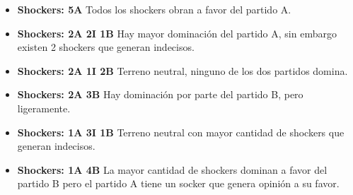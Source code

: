 \begin{itemize}
    \item \textbf{Shockers: 5A} Todos los shockers obran a favor del partido A.
    \item \textbf{Shockers: 2A 2I 1B} Hay mayor dominación del partido A, sin embargo existen 2 shockers que generan indecisos.
    \item \textbf{Shockers: 2A 1I 2B} Terreno neutral, ninguno de los dos partidos domina.
    \item \textbf{Shockers: 2A 3B} Hay dominación por parte del partido B, pero ligeramente.
    \item \textbf{Shockers: 1A 3I 1B} Terreno neutral con mayor cantidad de shockers que generan indecisos.
    \item \textbf{Shockers: 1A 4B} La mayor cantidad de shockers dominan a favor del partido B pero el partido A tiene un socker que genera opinión a su favor.  
\end{itemize}

